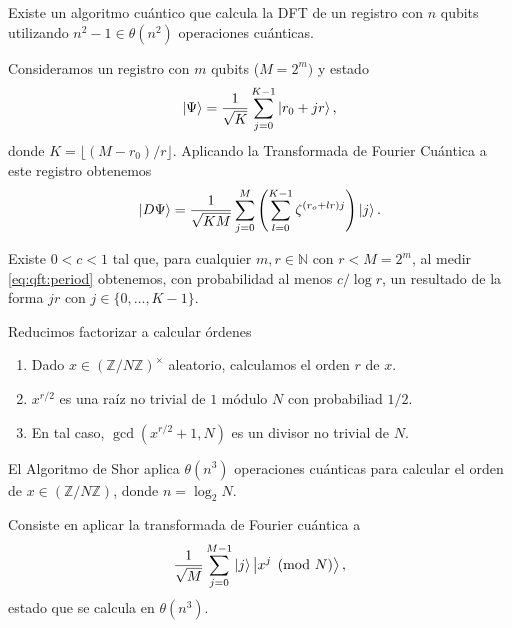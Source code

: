 \documentclass[11pt,compress]{beamer}
\begin{document}
\begin{frame}
    \fontsize{10}{5}\selectfont
\begin{lemma}
  Existe un algoritmo cuántico que calcula la DFT de un registro con $n$ qubits utilizando $n^2-1 \in \theta(n^2)$ operaciones cuánticas.
\end{lemma}

Consideramos un registro con $m$ qubits ($M = 2^m)$ y estado
\begin{equation} \label{eq:period}
  \ket{\Psi} = \frac{1}{\sqrt{K}}\sum_{j = 0}^{K-1} \ket{r_0 + j r},
\end{equation}
  donde $K = \lfloor (M-r_0) / r \rfloor$. 
  Aplicando la Transformada de Fourier Cuántica a este registro obtenemos
  \begin{equation} \label{eq:qft:period}
  \ket{D \Psi} = \frac{1}{\sqrt{K M}} \sum_{j = 0}^M \left(\sum_{l = 0}^{K-1} \zeta^{(r_o + l r) j} \right) \ket{j}.
  \end{equation}

\begin{theorem} \label{thm:qft}
  Existe $0 < c < 1$ tal que, para cualquier $m,r \in \mathbb{N}$ con $r < M = 2^m$, al medir \eqref{eq:qft:period} obtenemos, con probabilidad al menos $c/\log r$, un resultado de la forma $jr$ con $j \in \{0, \ldots, K-1\}$.
\end{theorem}

\end{frame}

\begin{frame}%

\begin{block}{Reducimos factorizar a calcular órdenes}
    \fontsize{10}{5}\selectfont
\begin{enumerate}
	\item Dado $x \in \left(\mathbb{Z} / N \mathbb{Z}\right)^\times$ aleatorio, calculamos el orden $r$ de $x$.
	\item $x^{r/2}$ es una raíz no trivial de $1$ módulo $N$ con probabiliad $1/2$.
	\item En tal caso, $\gcd(x^{r/2}+1, N)$ es un divisor no trivial de $N$.
	\end{enumerate}
\end{block}

\begin{theorem}
	El Algoritmo de Shor aplica $\theta(n^3)$ operaciones cuánticas para calcular el orden de $x \in \left(\mathbb{Z}/N\mathbb{Z}\right)$, donde $n = \log_2 N$.
\end{theorem}

Consiste en aplicar la transformada de Fourier cuántica a
\[\frac{1}{\sqrt{M}} \sum_{j = 0}^{M-1} \ket{j}\ket{x^j \pmod{N}},\]
estado que se calcula en $\theta(n^3)$.
\end{frame}
 
\end{document}
